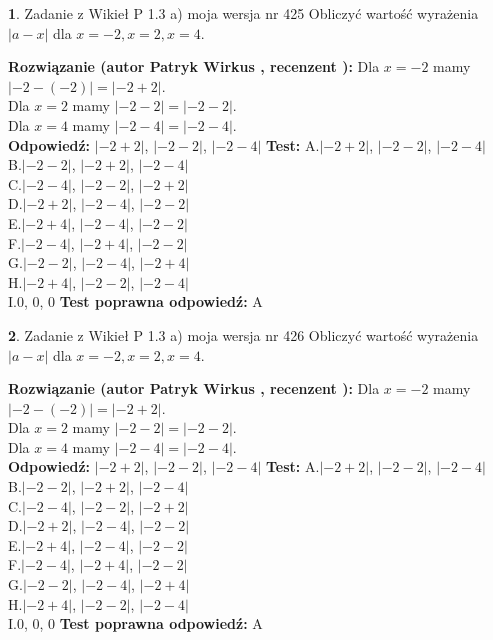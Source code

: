 \documentclass[12pt, a4paper]{article}
\theoremstyle{definition} %
\newtheorem{zad}{}
\newcommand{\zadStart}[1]{\begin{zad}#1\newline}
\newcommand{\zadStop}{\end{zad}}
\newcommand{\rozwStart}[2]{\noindent \textbf{Rozwiązanie (autor #1 , recenzent #2): }\newline}
\newcommand{\rozwStop}{\newline}
\newcommand{\odpStart}{\noindent \textbf{Odpowiedź:}\newline}
\newcommand{\odpStop}{\newline}
\newcommand{\testStart}{\noindent \textbf{Test:}\newline}
\newcommand{\testStop}{\newline}
\newcommand{\kluczStart}{\noindent \textbf{Test poprawna odpowiedź:}\newline}
\newcommand{\kluczStop}{\newline}
\begin{document}
\zadStart{Zadanie z Wikieł P 1.3 a) moja wersja nr 425}
Obliczyć wartość wyrażenia $|a - x|$ dla $x=-2,x=2,x=4$.
\zadStop
\rozwStart{Patryk Wirkus}{}
Dla $x = -2$ mamy $|-2 - (-2)| = |-2 + 2|$.\\
Dla $x = 2$ mamy $|-2 - 2| = |-2 - 2|$.\\
Dla $x = 4$ mamy $|-2 - 4| = |-2 - 4|$.\\
\rozwStop
\odpStart
$|-2 + 2|$, $|-2 - 2|$, $|-2 - 4|$
\odpStop
\testStart
A.$|-2 + 2|$, $|-2 - 2|$, $|-2 - 4|$\\
B.$|-2 - 2|$, $|-2 + 2|$, $|-2 - 4|$\\
C.$|-2 - 4|$, $|-2 - 2|$, $|-2 + 2|$\\
D.$|-2 + 2|$, $|-2 - 4|$, $|-2 - 2|$\\
E.$|-2 + 4|$, $|-2 - 4|$, $|-2 - 2|$\\
F.$|-2 - 4|$, $|-2 + 4|$, $|-2 - 2|$\\
G.$|-2 - 2|$, $|-2 - 4|$, $|-2 + 4|$\\
H.$|-2 + 4|$, $|-2 - 2|$, $|-2 - 4|$\\
I.$0$, $0$, $0$
\testStop
\kluczStart
A
\kluczStop



\zadStart{Zadanie z Wikieł P 1.3 a) moja wersja nr 426}
Obliczyć wartość wyrażenia $|a - x|$ dla $x=-2,x=2,x=4$.
\zadStop
\rozwStart{Patryk Wirkus}{}
Dla $x = -2$ mamy $|-2 - (-2)| = |-2 + 2|$.\\
Dla $x = 2$ mamy $|-2 - 2| = |-2 - 2|$.\\
Dla $x = 4$ mamy $|-2 - 4| = |-2 - 4|$.\\
\rozwStop
\odpStart
$|-2 + 2|$, $|-2 - 2|$, $|-2 - 4|$
\odpStop
\testStart
A.$|-2 + 2|$, $|-2 - 2|$, $|-2 - 4|$\\
B.$|-2 - 2|$, $|-2 + 2|$, $|-2 - 4|$\\
C.$|-2 - 4|$, $|-2 - 2|$, $|-2 + 2|$\\
D.$|-2 + 2|$, $|-2 - 4|$, $|-2 - 2|$\\
E.$|-2 + 4|$, $|-2 - 4|$, $|-2 - 2|$\\
F.$|-2 - 4|$, $|-2 + 4|$, $|-2 - 2|$\\
G.$|-2 - 2|$, $|-2 - 4|$, $|-2 + 4|$\\
H.$|-2 + 4|$, $|-2 - 2|$, $|-2 - 4|$\\
I.$0$, $0$, $0$
\testStop
\kluczStart
A
\kluczStop
\end{document}
